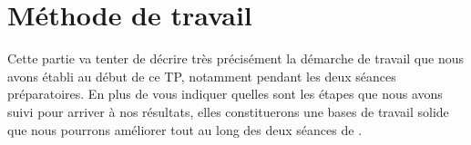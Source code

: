 \section{Méthode de travail}
Cette partie va tenter de décrire très précisément la démarche de travail que nous avons établi au début de ce TP, notamment pendant les deux séances préparatoires. En plus de vous indiquer quelles sont les étapes que nous avons suivi pour arriver à nos résultats, elles constituerons une bases de travail solide que nous pourrons améliorer tout au long des deux séances de .



